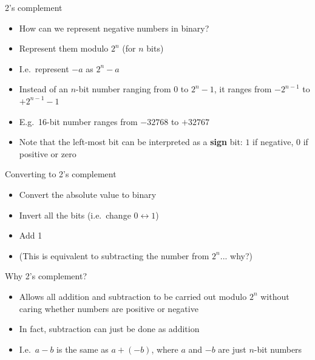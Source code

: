 \begin{frame}{2's complement}
    \begin{itemize}
        \pause\item How can we represent negative numbers in binary?
        \pause\item Represent them modulo $2^n$ (for $n$ bits)
        \pause\item I.e.\ represent $-a$ as $2^n-a$
        \pause\item Instead of an $n$-bit number ranging from $0$ to $2^n-1$, it ranges from $-2^{n-1}$ to $+2^{n-1}-1$
        \pause\item E.g.\ 16-bit number ranges from $-32768$ to $+32767$
        \pause\item Note that the left-most bit can be interpreted as a \textbf{sign} bit:
            $1$ if negative, $0$ if positive or zero
    \end{itemize}
\end{frame}

\begin{frame}{Converting to 2's complement}
    \begin{itemize}
        \pause\item Convert the absolute value to binary
        \pause\item Invert all the bits (i.e.\ change $0 \leftrightarrow 1$)
        \pause\item Add 1
        \pause\item (This is equivalent to subtracting the number from $2^n$... why?)
    \end{itemize}
\end{frame}

\begin{frame}{Why 2's complement?}
    \begin{itemize}
        \pause\item Allows all addition and subtraction to be carried out modulo $2^n$
            without caring whether numbers are positive or negative
        \pause\item In fact, subtraction can just be done as addition
        \pause\item I.e.\ $a-b$ is the same as $a+(-b)$, where $a$ and $-b$ are just $n$-bit numbers
    \end{itemize}
\end{frame}
